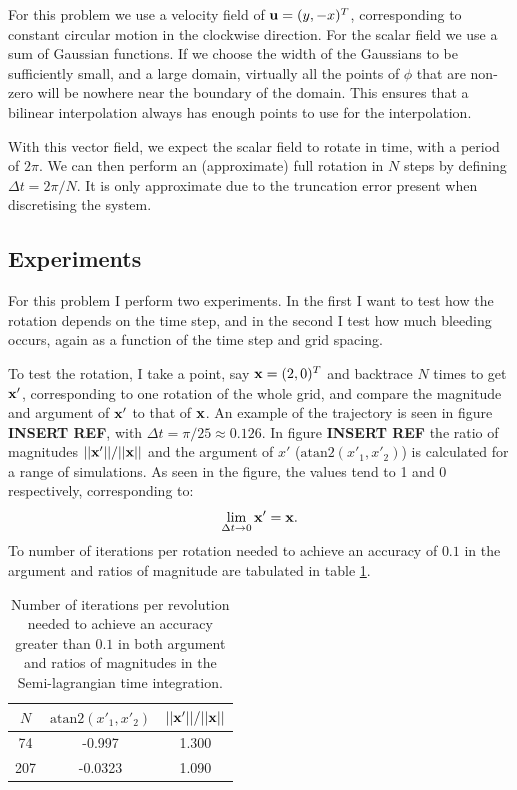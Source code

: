 \documentclass[sigconf]{acmart}
\begin{document}
For this problem we use a velocity field of $ \mathbf{u} = (y, -x)^T $, corresponding to constant circular motion in the clockwise direction. For the scalar field we use a sum of Gaussian functions. If we choose the width of the Gaussians to be sufficiently small, and a large domain, virtually all the points of $ \phi $ that are non-zero will be nowhere near the boundary of the domain. This ensures that a bilinear interpolation always has enough points to use for the interpolation.

With this vector field, we expect the scalar field to rotate in time, with a period of $ 2\pi $. We can then perform an (approximate) full rotation in $ N $ steps by defining $ \Delta t = 2\pi/N $. It is only approximate due to the truncation error present when discretising the system.


\subsection{Experiments}
For this problem I perform two experiments. In the first I want to test how the rotation depends on the time step, and in the second I test how much bleeding occurs, again as a function of the time step and grid spacing.

To test the rotation, I take a point, say $ \mathbf{x} = (2,0)^T $ and backtrace $ N $ times to get $ \mathbf{x}' $, corresponding to one rotation of the whole grid, and compare the magnitude and argument of $ \mathbf{x}' $ to that of $ \mathbf{x} $. An example of the trajectory is seen in figure \textbf{INSERT REF}, with $ \Delta t = \pi/25\approx 0.126 $. In figure \textbf{INSERT REF} the ratio of magnitudes $ ||\mathbf{x}'|| / ||\mathbf{x}|| $ and the argument of $ x' $ ($ \text{atan2}(x'_1, x'_2) $) is calculated for a range of simulations. As seen in the figure, the values tend to 1 and 0 respectively, corresponding to:
\begin{equation}\label{key}
	\lim\limits_{\Delta t \to 0} \mathbf{x}' = \mathbf{x}.
\end{equation}
To number of iterations per rotation needed to achieve an accuracy of $ 0.1 $ in the argument and ratios of magnitude are tabulated in table \ref{tab:arg_mag}.

\begin{table}
	\centering
	\begin{tabular}{ccc}
		\hline
		$ N $ & $ \text{atan2}(x'_1, x'_2) $ & $ ||\mathbf{x}'|| / ||\mathbf{x}|| $ \\
		\hline
		74 & -0.997 & 1.300 \\
		207 & -0.0323 & 1.090 \\
		\hline
	\end{tabular}
	\caption{Number of iterations per revolution needed to achieve an accuracy greater than $ 0.1 $ in both argument and ratios of magnitudes in the Semi-lagrangian time integration.}
	\label{tab:arg_mag}
\end{table} 
\end{document}
